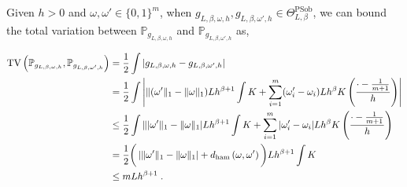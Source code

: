 \documentclass[10pt]{article} %
\newcommand{\Prob}[0]{\mathbb{P}}
\newcommand\tv[2]{\mathrm{TV}\left( {#1}, {#2} \right)}
\newcommand\ham[2]{d_\mathrm{ham}\left( {#1}, {#2} \right)}
\newcommand\p[1]{\left( {#1}\right)}
\begin{document}
Given $h>0$ and $\omega, \omega' \in \{0, 1\}^m$, when $g_{L, \beta, \omega, h}, g_{L, \beta, \omega', h} \in \Theta^{\text{PSob}}_{L, \beta}$, we can bound the total variation between $\Prob_{g_{L, \beta, \omega, h}}$ and  $\Prob_{g_{L, \beta, \omega', h}}$ as,

\begin{align}
    \tv{\Prob_{g_{L, \beta, \omega, h}}}{\Prob_{g_{L, \beta, \omega', h}}} 
    &=
    \frac{1}{2} \int \left| g_{L, \beta, \omega, h} - g_{L, \beta, \omega', h} \right| \notag \\
    &=
    \frac{1}{2} \int \left| \| (\omega' \|_1 - \| \omega \|_1) L h^{\beta + 1} \int K + \sum_{i=1}^m (\omega_i' - \omega_i) L h^{\beta } K\p{\frac{\cdot - \frac{1}{m+1}}{h}}\right| \notag\\
    &\leq
   \frac{1}{2} \int \| |\omega' \|_1 - \| \omega \|_1| L h^{\beta + 1} \int K + \sum_{i=1}^m |\omega_i' - \omega_i| L h^{\beta } K\p{\frac{\cdot - \frac{1}{m+1}}{h}} \notag\\
    &=
    \frac{1}{2} \bigg( \left| \| \omega' \|_1 - \| \omega \|_1\right|  + \ham{\omega}{\omega'}\bigg) L h^{\beta+1} \int K \label{eq:tvkernelsawham}\\
    &\leq mL h^{\beta+1} \label{eq:tvkernelsaw}\;.
\end{align}
\end{document}

